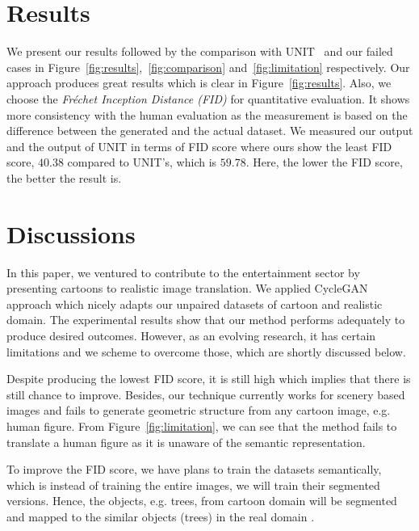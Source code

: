 \documentclass[10pt,twocolumn,letterpaper]{article}
\begin{document}

\section{Results}
We present our results followed by the comparison with UNIT~\cite{liu2017unsupervised} and our failed cases in Figure~\ref{fig:results},~\ref{fig:comparison} and~\ref{fig:limitation} respectively. Our approach produces great results which is clear in Figure~\ref{fig:results}. Also, we choose the \textit{Fr\'echet Inception Distance (FID)} \cite{heusel2017gans} for quantitative evaluation. It shows more consistency with the human evaluation as the measurement is based on the difference between the generated and the actual dataset. We measured our output and the output of UNIT in terms of FID score where ours show the least FID score, $40.38$ compared to UNIT's, which is $59.78$. Here, the lower the FID score, the better the result is.


\section{Discussions}
In this paper, we ventured to contribute to the entertainment sector by presenting cartoons to realistic image translation. We applied CycleGAN approach which nicely adapts our unpaired datasets of cartoon and realistic domain. The experimental results show that our method performs adequately to produce desired outcomes. However, as an evolving research, it has certain limitations and we scheme to overcome those, which are shortly discussed below.

Despite producing the lowest FID score, it is still high which implies that there is still chance to improve. Besides, our technique currently works for scenery based images and fails to generate geometric structure from any cartoon image, e.g. human figure. From Figure~\ref{fig:limitation}, we can see that the method fails to translate a human figure as it is unaware of the semantic representation.

To improve the FID score, we have plans to train the datasets semantically, which is instead of training the entire images, we will train their segmented versions. Hence, the objects, e.g. trees, from cartoon domain will be segmented and mapped to the similar objects (trees) in the real domain \cite{mo2018instagan, tomei2018art2real}.
\end{document}
